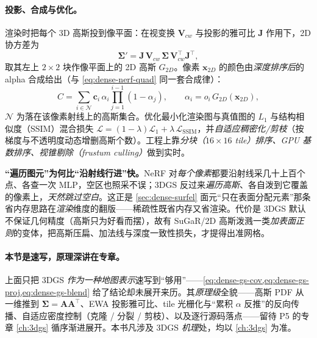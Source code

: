 \paragraph{投影、合成与优化。}
渲染时把每个 3D 高斯投到像平面：在视变换 $\mathbf{V}_{cw}$ 与投影的雅可比 $\mathbf{J}$ 作用下，2D 协方差为
\begin{equation}
  \boldsymbol{\Sigma}'=\mathbf{J}\,\mathbf{V}_{cw}\,\boldsymbol{\Sigma}\,\mathbf{V}_{cw}^\top\mathbf{J}^\top,
  \label{eq:dense-gs-proj}
\end{equation}
取其左上 $2\times2$ 块作像平面上的 2D 高斯 $G_{2D}$。像素 $\mathbf{x}_{2D}$ 的颜色由\emph{深度排序后}的 alpha 合成给出（与 \cref{eq:dense-nerf-quad} 同一套合成律）：
\begin{equation}
  C=\sum_{i\in\mathcal{N}}\mathbf{c}_i\,\alpha_i\prod_{j=1}^{i-1}(1-\alpha_j),
  \qquad
  \alpha_i=o_i\,G_{2D}(\mathbf{x}_{2D}),
  \label{eq:dense-gs-blend}
\end{equation}
$\mathcal{N}$ 为落在该像素射线上的高斯集合。优化最小化渲染图与真值图的 $L_1$ 与结构相似度（SSIM）混合损失 $\mathcal{L}=(1-\lambda)\mathcal{L}_1+\lambda\,\mathcal{L}_{\mathrm{SSIM}}$，并\emph{自适应稠密化/剪枝}（按梯度与不透明度动态增删高斯个数）。工程上靠\emph{分块（$16\times16$ tile）排序、GPU 基数排序、视锥剔除（frustum culling）}做到实时。

\begin{insight}
\textbf{“遍历图元”为何比“沿射线行进”快。}NeRF 对\emph{每个像素}都要沿射线采几十上百个点、各查一次 MLP，空区也照采不误；3DGS 反过来\emph{遍历高斯}、各自泼到它覆盖的像素上，\emph{天然跳过空白}。这正是 \cref{sec:dense-surfel} 面元“只在表面分配元素”那条省内存思路在\emph{渲染}维度的翻版——稀疏性既省内存又省渲染。代价是 3DGS 默认不保证几何精度（高斯只为好看而摆），故有 SuGaR/2D 高斯泼溅一类\emph{加表面正则}的变体，把高斯压扁、加法线与深度一致性损失，才提得出准网格。
\end{insight}

\paragraph{本节是速写，原理深讲在专章。}上面只把 3DGS \emph{作为一种地图表示}速写到“够用”——\cref{eq:dense-gs-cov,eq:dense-gs-proj,eq:dense-gs-blend} 给了结论却未展开来历。其\emph{原理级}全貌——高斯 PDF 从一维推到 $\boldsymbol{\Sigma}=\mathbf{A}\mathbf{A}^\top$、EWA 投影雅可比、tile 光栅化与“累积 $\alpha$ 反推”的反向传播、自适应密度控制（克隆 / 分裂 / 剪枝）、以及逐行源码落点——留待 P5 的专章 \cref{ch:3dgs} 循序渐进展开。本书凡涉及 3DGS \emph{机理}处，均以 \cref{ch:3dgs} 为准。

